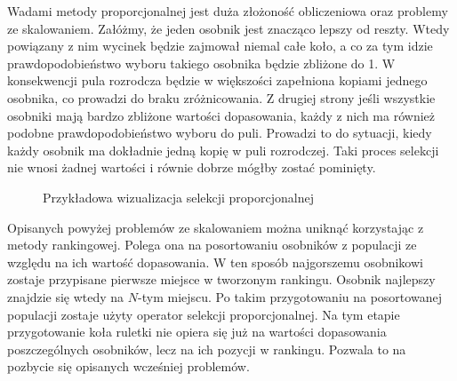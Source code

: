 \documentclass[twoside]{iisthesis}
\begin{document}
Wadami metody proporcjonalnej jest duża złożoność obliczeniowa oraz problemy ze skalowaniem. Załóżmy, że jeden osobnik jest znacząco lepszy od reszty. Wtedy powiązany z nim wycinek będzie zajmował niemal całe koło, a co za tym idzie prawdopodobieństwo wyboru takiego osobnika będzie zbliżone do 1. W konsekwencji pula rozrodcza będzie w większości zapełniona kopiami jednego osobnika, co prowadzi do braku zróżnicowania. Z drugiej strony jeśli wszystkie osobniki mają bardzo zbliżone wartości dopasowania, każdy z nich ma również podobne prawdopodobieństwo wyboru do puli. Prowadzi to do sytuacji, kiedy każdy osobnik ma dokładnie jedną kopię w puli rozrodczej. Taki proces selekcji nie wnosi żadnej wartości i równie dobrze mógłby zostać pominięty. 
\begin{figure}[!htb]
	\centering
	\caption{Przykładowa wizualizacja selekcji proporcjonalnej}
	\label{fig:roulette}
\end{figure}

Opisanych powyżej problemów ze skalowaniem można uniknąć korzystając z metody rankingowej. Polega ona na posortowaniu osobników z populacji ze względu na ich wartość dopasowania. W ten sposób najgorszemu osobnikowi zostaje przypisane pierwsze miejsce w tworzonym rankingu. Osobnik najlepszy znajdzie się wtedy na $N$-tym miejscu. Po takim przygotowaniu na posortowanej populacji zostaje użyty operator selekcji proporcjonalnej. Na tym etapie przygotowanie koła ruletki nie opiera się już na wartości dopasowania poszczególnych osobników, lecz na ich pozycji w rankingu. Pozwala to na pozbycie się opisanych wcześniej problemów.
\end{document}
